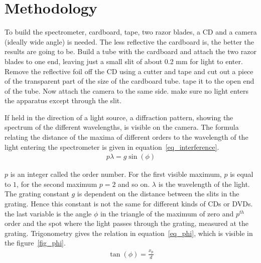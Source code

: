 \section{Methodology} \label{sec_methodology}

    To build the spectrometer, cardboard, tape, two razor blades, a CD and a camera (ideally wide angle) is needed.
    The less reflective the cardboard is, the better the results are going to be.
    Build a tube with the cardboard and attach the two razor blades to one end, leaving just a small slit of about 0.2 mm for light to enter.
    Remove the reflective foil off the CD using a cutter and tape and cut out a piece of the transparent part of the size of the cardboard tube.
    tape it to the open end of the tube.
    Now attach the camera to the same side.
    make sure no light enters the apparatus except through the slit.

    If held in the direction of a light source, a diffraction pattern, showing the spectrum of the different wavelengths, is visible on the camera.
    The formula relating the distance of the maxima of different orders to the wavelength of the light entering the spectrometer is given in equation~\eqref{eq_interference}.
    \begin{align}
        p \lambda = g \sin(\phi) \label{eq_interference}
    \end{align}

    $p$ is an integer called the order number. For the first visible maximum, $p$ is equal to $1$, for the second maximum $p = 2$ and so on.
    $\lambda$ is the wavelength of the light.
    The grating constant $g$ is dependent on the distance between the slits in the grating.
    Hence this constant is not the same for different kinds of CDs or DVDs.
    the last variable is the angle $\phi$ in the triangle of the maximum of zero and $p^{th}$ order and the spot where the light passes through the grating, measured at the grating.
    Trigonometry gives the relation in equation~\eqref{eq_phi}, which is visible in the figure~\ref{fig_phi}.
    \begin{align}
        \tan(\phi) = \frac{x_p}{d} \label{eq_phi}
    \end{align}

